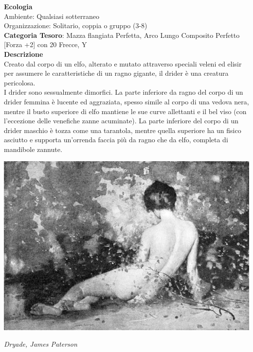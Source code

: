 \begin{multicols}{2}
{\textbf{Ecologia}\\
Ambiente: Qualsiasi sotterraneo\\
Organizzazione: Solitario, coppia o gruppo (3-8)\\
\textbf{Categoria Tesoro}: Mazza flangiata Perfetta, Arco Lungo Composito Perfetto [Forza +2] con 20 Frecce, Y\\
\textbf{Descrizione}\\
Creato dal corpo di un elfo, alterato e mutato attraverso speciali veleni ed elisir per assumere le caratteristiche di un ragno gigante, il drider è una creatura pericolosa.\\
I drider sono sessualmente dimorfici. La parte inferiore da ragno del corpo di un drider femmina è lucente ed aggraziata, spesso simile al corpo di una vedova nera, mentre il busto superiore di elfo mantiene le sue curve allettanti e il bel viso (con l'eccezione delle venefiche zanne acuminate). La parte inferiore del corpo di un drider maschio è tozza come una tarantola, mentre quella superiore ha un fisico asciutto e supporta un'orrenda faccia più da ragno che da elfo, completa di mandibole zannute.


\begin{center}
\includegraphics[width=0.9\linewidth]{immagini/James_Paterson_-_Dryade.png}

\emph{Dryade, James Paterson}
\end{center}

}
\end{multicols}
